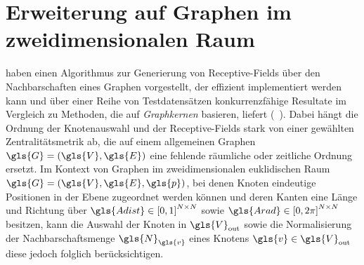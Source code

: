 \section{Erweiterung auf Graphen im zweidimensionalen Raum}
\label{raeumliche_erweiterung}

\citeauthor{patchy} haben einen Algorithmus zur Generierung von Receptive-Fields über den Nachbarschaften eines Graphen vorgestellt, der effizient implementiert werden kann und über einer Reihe von Testdatensätzen konkurrenzfähige Resultate im Vergleich zu Methoden, die auf \emph{Graphkernen} basieren, liefert (\vgl{}~\cite{patchy}).
Dabei hängt die Ordnung der Knotenauswahl und der Receptive-Fields stark von einer gewählten Zentralitätsmetrik ab, die auf einem allgemeinen Graphen $\gls{G} = \left(\gls{V}, \gls{E}\right)$ eine fehlende räumliche oder zeitliche Ordnung ersetzt.
Im Kontext von Graphen im zweidimensionalen euklidischen Raum $\gls{G} = \left(\gls{V}, \gls{E}, \gls{p}\right)$, bei denen Knoten eindeutige Positionen in der Ebene zugeordnet werden können und deren Kanten eine Länge und Richtung über $\gls{Adist} \in {\left[0, 1\right]}^{N \times N}$ sowie $\gls{Arad} \in {\left[0, 2\pi\right]}^{N \times N}$ besitzen, kann die Auswahl der Knoten in $\gls{V}_{\mathrm{out}}$ sowie die Normalisierung der Nachbarschaftsmenge $\gls{N}_{\gls{v}}$ eines Knotens $\gls{v} \in \gls{V}_{\mathrm{out}}$ diese jedoch folglich berücksichtigen.

